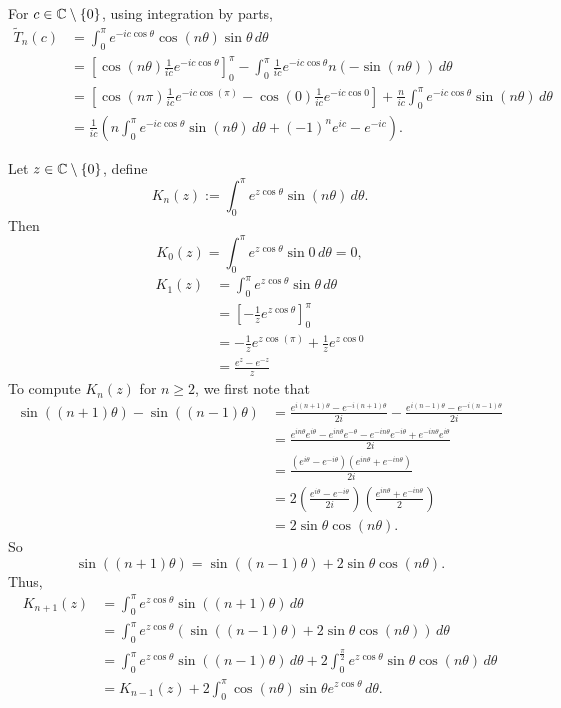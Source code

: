 \documentclass[12pt, oneside, a4paper]{article}
\begin{document}
For $c\in\mathbb C\setminus\{0\}$, using integration by parts,
\begin{align*}
    \tilde{T}_n(c) &= \int_0^\pi e^{-ic\cos\theta}\cos(n\theta)\sin\theta\,d\theta\\
    &= \left[\cos(n\theta)\frac{1}{ic}e^{-ic\cos\theta}\right]_0^{\pi} - \int_0^{\pi}\frac{1}{ic}e^{-ic\cos\theta}n(-\sin(n\theta))\,d\theta\\
    &= \left[\cos(n\pi)\frac{1}{ic}e^{-ic\cos(\pi)} - \cos(0)\frac{1}{ic}e^{-ic\cos 0}\right] + \frac{n}{ic}\int_0^{\pi}e^{-ic\cos\theta}\sin(n\theta)\,d\theta\\
    &= \frac{1}{ic}\left(n\int_0^{\pi}e^{-ic\cos\theta}\sin(n\theta)\,d\theta + (-1)^n e^{ic}- e^{-ic}\right).
\end{align*}

Let $z\in \mathbb C\setminus\{0\}$, define 
\[K_n(z):=\int_0^\pi e^{z\cos\theta}\sin(n\theta)\,d\theta.\]
Then
$$K_0(z) = \int_0^{\pi}e^{z\cos\theta}\sin 0\,d\theta=0,$$
\begin{align*}
K_1(z) &= \int_0^{\pi}e^{z\cos\theta}\sin\theta\,d\theta\\
&= \left[-\frac{1}{z}e^{z\cos\theta}\right]_0^{\pi}\\
&= -\frac{1}{z}e^{z\cos(\pi)} + \frac{1}{z}e^{z\cos 0}\\
&= \frac{e^z - e^{-z}}{z}
\end{align*}
To compute $K_n(z)$ for $n\geq 2$, we first note that
\begin{align*}
\sin((n+1)\theta) - \sin((n-1)\theta) &= \frac{e^{i(n+1)\theta} - e^{-i(n+1)\theta}}{2i} - \frac{e^{i(n-1)\theta} - e^{-i(n-1)\theta}}{2i}\\
&= \frac{e^{in\theta}e^{i\theta} - e^{in\theta}e^{-\theta} - e^{-in\theta}e^{-i\theta} + e^{-in\theta}e^{i\theta}}{2i}\\
&= \frac{(e^{i\theta}-e^{-i\theta})(e^{in\theta}+e^{-in\theta})}{2i}\\
&= 2\left(\frac{e^{i\theta}-e^{-i\theta}}{2i}\right)\left(\frac{e^{in\theta}+e^{-in\theta}}{2}\right)\\
&= 2\sin\theta\cos(n\theta).
\end{align*}
So
$$\sin((n+1)\theta) = \sin((n-1)\theta) + 2\sin\theta\cos(n\theta).$$
Thus,
\begin{align*}
K_{n+1}(z) &= \int_0^{\pi}e^{z\cos\theta}\sin((n+1)\theta)\,d\theta\\
&= \int_0^{\pi}e^{z\cos\theta}(\sin((n-1)\theta) + 2\sin\theta\cos(n\theta))\,d\theta\\
&= \int_0^{\pi}e^{z\cos\theta}\sin((n-1)\theta)\,d\theta + 2\int_0^{\frac{\pi}{2}}e^{z\cos\theta}\sin\theta\cos(n\theta)\,d\theta\\
&= K_{n-1}(z) + 2\int_0^{\pi}\cos(n\theta)\sin\theta e^{z\cos\theta}\,d\theta.
\end{align*}
\end{document}
